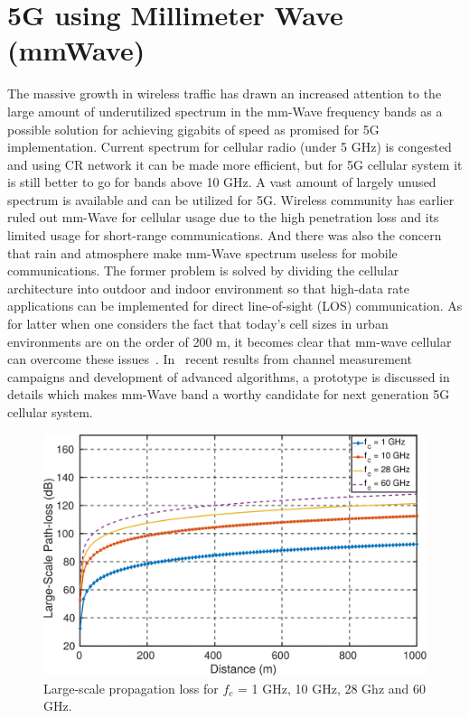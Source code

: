 \section{5G using Millimeter Wave (mmWave)}

The massive growth in wireless traffic has drawn an increased attention to the large amount of underutilized spectrum in the mm-Wave frequency bands as a possible solution for achieving gigabits of speed as promised for 5G implementation. Current spectrum for cellular radio (under 5 GHz) is congested and using CR network it can be made more efficient, but for 5G cellular system it is still better to go for bands above 10 GHz. A vast amount of largely unused spectrum is available and can be utilized for 5G. Wireless community has earlier ruled out mm-Wave for cellular usage due to the high penetration loss and its limited usage for short-range communications. And there was also the concern that rain and atmosphere make mm-Wave spectrum useless for mobile communications. The former problem is solved by dividing the cellular architecture into outdoor and indoor environment so that high-data rate applications can be implemented for direct line-of-sight (LOS) communication. As for latter when one considers the fact that today’s cell sizes in urban environments are on the order of 200 m, it becomes clear that mm-wave cellular can overcome these issues~\cite{6515173}. In~\cite{roh2014millimeter} recent results from channel measurement campaigns and development of advanced algorithms, a prototype is discussed in details which makes mm-Wave band a worthy candidate for next generation 5G cellular system.

\begin{figure}[!ht]
	\centering
\includegraphics[width=\textwidth,keepaspectratio]{images/Gill/5G/pathloss.eps}
	\caption{Large-scale propagation loss for $f_c$ = 1 GHz, 10 GHz, 28 Ghz and 60 GHz.}
	\label{pathloss}
\end{figure}

